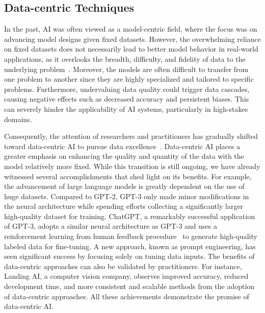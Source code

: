 \documentclass[withindex,glossary,firstyr]{cam-thesis}
\begin{document}


\subsection{Data-centric Techniques} 

In the past, AI was often viewed as a model-centric field, where the focus was on advancing model designs given fixed datasets. However, the overwhelming reliance on fixed datasets does not necessarily lead to better model behavior in real-world applications, as it overlooks the breadth, difficulty, and fidelity of data to the underlying problem~\cite{mazumder2023dataperf}. Moreover, the models are often difficult to transfer from one problem to another since they are highly specialized and tailored to specific problems. Furthermore, undervaluing data quality could trigger data cascades, causing negative effects such as decreased accuracy and persistent biases. This can severely hinder the applicability of AI systems, particularly in high-stakes domains.


Consequently, the attention of researchers and practitioners has gradually shifted toward data-centric AI to pursue data excellence~\cite{aroyo2021data}. Data-centric AI places a greater emphasis on enhancing the quality and quantity of the data with the model relatively more fixed. While this transition is still ongoing, we have already witnessed several accomplishments that shed light on its benefits. For example, the advancement of large language models is greatly dependent on the use of huge datasets. Compared to GPT-2, GPT-3 only made minor modifications in the neural architecture while spending efforts collecting a significantly larger high-quality dataset for training. ChatGPT, a remarkably successful application of GPT-3, adopts a similar neural architecture as GPT-3 and uses a reinforcement learning from human feedback procedure~\cite{NIPS2017_d5e2c0ad} to generate high-quality labeled data for fine-tuning. A new approach, known as prompt engineering, has seen significant success by focusing solely on tuning data inputs. The benefits of data-centric approaches can also be validated by practitioners. For instance, Landing AI, a computer vision company, observes improved accuracy, reduced development time, and more consistent and scalable methods from the adoption of data-centric approaches. All these achievements demonstrate the promise of data-centric AI.
\end{document}
